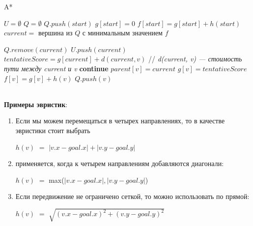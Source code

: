         \begin{algorithm}
            \caption{A*}
            \begin{algorithmic}
                \STATE $U = \emptyset$
                \STATE $Q = \emptyset$
                \STATE $Q.push(start)$
                \STATE $g[start] = 0$
                \STATE $f[start] = g[start] + h(start)$
                    \STATE $current = $ вершина из $Q$ с минимальным значением $f$
                    \ENDIF

                    \STATE $Q.remove(current)$
                    \STATE $U.push(current)$
                        \STATE $tentativeScore = g[current] + d(current, v) $ // \textit{d(current, v) — стоимость пути между current и v}
                            \STATE \textbf{continue}
                        \ENDIF
                            \STATE $parent[v] = current$
                            \STATE $g[v] = tentativeScore$
                            \STATE $f[v] = g[v] + h(v)$
                                \STATE $Q.push(v)$
                            \ENDIF  
                        \ENDIF
                    \ENDFOR
                \ENDWHILE
            \end{algorithmic}
        \end{algorithm}\\

        \textbf{Примеры эвристик}:
        \begin{enumerate}
            \item Если мы можем перемещаться в четырех направлениях, то в качестве эвристики стоит выбрать 
                \begin{center}
                    $h(v)$ $=$ $|v.x - goal.x| + |v.y - goal.y|$
                \end{center}
            \item {} применяется, когда к четырем направлениям добавляются диагонали:
                \begin{center}
                    $h(v)$ $=$ max($|v.x - goal.x|, |v.y - goal.y|$)
                \end{center}
            \item Если передвижение не ограничено сеткой, то можно использовать  по прямой:
                \begin{center}
                    $h(v)$ $=$ $\sqrt{(v.x - goal.x)^2 + (v.y - goal.y)^2}$
                \end{center}
        \end{enumerate}
    
